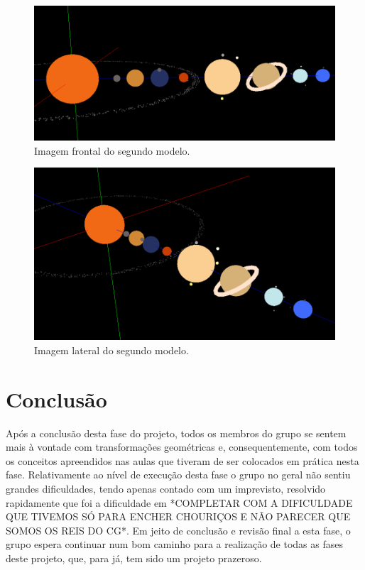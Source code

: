 \documentclass[a4paper]{article}
\begin{document}
\begin{figure}[H]
\centering
\includegraphics[scale=0.4]{modelo2_1.png}
\caption{Imagem frontal do segundo modelo.}
\label{img:modelo2_1}
\end{figure}

\begin{figure}[H]
\centering
\includegraphics[scale=0.4]{modelo2_2.png}
\caption{Imagem lateral do segundo modelo.}
\label{img:modelo2_2}
\end{figure}


\newpage

\section{Conclusão}
\label{sec:conclusao}

Após a conclusão desta fase do projeto, todos os membros do grupo se sentem mais à vontade com transformações geométricas e, consequentemente, com todos os conceitos apreendidos nas aulas que tiveram de ser colocados em prática nesta fase. Relativamente ao nível de execução desta fase o grupo no geral não sentiu grandes dificuldades, tendo apenas contado com um imprevisto, resolvido rapidamente que foi a dificuldade em *COMPLETAR COM A DIFICULDADE QUE TIVEMOS SÓ PARA ENCHER CHOURIÇOS E NÃO PARECER QUE SOMOS OS REIS DO CG*.
Em jeito de conclusão e revisão final a esta fase, o grupo espera continuar num bom caminho para a realização de todas as fases deste projeto, que, para já, tem sido um projeto prazeroso.
\end{document}
